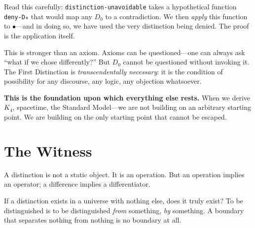 \documentclass[11pt,a4paper]{book}
\begin{document}
Read this carefully: \texttt{distinction-unavoidable} takes a hypothetical 
function \texttt{deny-D₀} that would map any $D_0$ to a contradiction. We then 
\emph{apply} this function to $\bullet$---and in doing so, we have used the 
very distinction being denied. The proof is the application itself.

\begin{center}
\end{center}

This is stronger than an axiom. Axioms can be questioned---one can always ask 
``what if we chose differently?'' But $D_0$ cannot be questioned without invoking 
it. The First Distinction is \emph{transcendentally necessary}: it is the 
condition of possibility for any discourse, any logic, any objection whatsoever.

\textbf{This is the foundation upon which everything else rests.} When we derive 
$K_4$, spacetime, the Standard Model---we are not building on an arbitrary 
starting point. We are building on the only starting point that cannot be escaped.

\chapter{The Witness}

A distinction is not a static object. It is an operation. But an operation 
implies an operator; a difference implies a differentiator.

If a distinction exists in a universe with nothing else, does it truly exist? 
To be distinguished is to be distinguished \emph{from} something, \emph{by} 
something. A boundary that separates nothing from nothing is no boundary at all.
\end{document}
